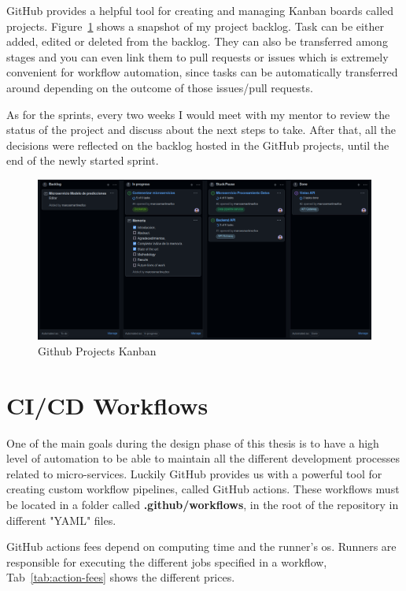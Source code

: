 GitHub provides a helpful tool for creating and managing \gls{Kanban} boards called projects. Figure~\ref{fig:github-projects} shows a snapshot of my project backlog. Task can be either added, edited or deleted from the backlog. They can also be transferred among stages and you can even link them to pull requests or issues which is extremely convenient for workflow automation, since tasks can be automatically transferred around depending on the outcome of those issues/pull requests.

As for the sprints, every two weeks I would meet with my mentor to review the status of the project and discuss about the next steps to take. After that, all the decisions were reflected on the backlog hosted in the GitHub projects, until the end of the newly started sprint.

\begin{figure}[h]
    \centering
    \includegraphics[width=\textwidth]{figures/github-projects.png}
    \caption{Github Projects Kanban}
    \label{fig:github-projects}
\end{figure}

\section{CI/CD Workflows}

One of the main goals during the design phase of this thesis is to have a high level of automation to be able to maintain all the different development processes related to micro-services. Luckily GitHub provides us with a powerful tool for creating custom workflow pipelines, called GitHub actions. These workflows must be located in a folder called \textbf{.github/workflows}, in the root of the repository in different "YAML" files.

GitHub actions fees depend on computing time and the runner's \gls{os}. Runners are responsible for executing the different jobs specified in a workflow, Tab~\ref{tab:action-fees} shows the different prices.

